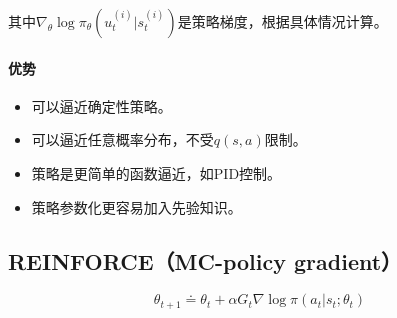 \documentclass[
12pt, %
a4paper, 
oneside, %
headinclude,footinclude, %
]{scrartcl}
\begin{document}
其中$ \nabla_\theta\log\pi_\theta(u_t^{(i)}|s_t^{(i)}) $是策略梯度，根据具体情况计算。
\paragraph{优势}
\begin{itemize}
\item 可以逼近确定性策略。
\item 可以逼近任意概率分布，不受$ q(s, a) $限制。
\item 策略是更简单的函数逼近，如PID控制。
\item 策略参数化更容易加入先验知识。
\end{itemize}
\subsection{REINFORCE（MC-policy gradient）}
$$ \theta_{t + 1} \doteq \theta_t + \alpha G_t \nabla\log \pi (a_t|s_t; \theta_t) $$
\end{document}
